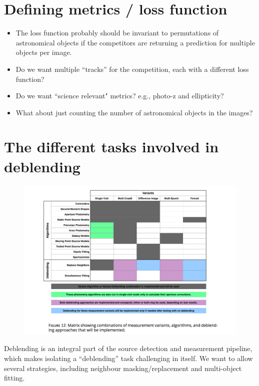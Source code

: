 \documentclass[10pt,letter]{article}
\begin{document}
\section{Defining metrics / loss function}
\begin{itemize}
\item The loss function probably should be invariant to permutations of astronomical objects if the competitors are returning a prediction for multiple objects per image.
\item Do we want multiple ``tracks'' for the competition, each with a different loss function?
\item Do we want ``science relevant" metrics? e.g., photo-z and ellipticity?
\item What about just counting the number of astronomical objects in the images?
\end{itemize}

\section{The different tasks involved in deblending}

\begin{figure}
    \centering
    \includegraphics[width=\textwidth]{Figures/Figure12LDM-151.png}
    \label{fig:DM-fig12}
\end{figure}

Deblending is an integral part of the source detection and measurement pipeline, which makes isolating a ``deblending'' task challenging in itself. We want to allow several strategies, including neighbour masking/replacement and multi-object fitting.
\end{document}
